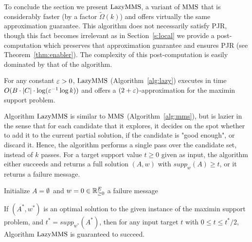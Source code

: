 To conclude the section we present $\lazy$, a variant of $\operatorname{MMS}$ that is considerably faster (by a factor $\tilde{\Omega}(k)$) and offers virtually the same approximation guarantee. 
This algorithm does not necessarily satisfy PJR, though this fact becomes irrelevant as in Section~\ref{s:local} we provide a post-computation which preserves that approximation guarantee and ensures PJR (see Theorem~\ref{thm:enabler}). The complexity of this post-computation is easily dominated by that of the algorithm.

\begin{theorem}\label{thm:2eps}
For any constant $\varepsilon>0$, $\lazy$ (Algorithm~\ref{alg:lazy}) executes in time $O(B\cdot |C|\cdot \log(\varepsilon^{-1} \log k))$ and offers a $(2+\varepsilon)$-approximation for the maximin support problem.
\end{theorem}

Algorithm $\lazy$ is similar to $\operatorname{MMS}$ (Algorithm~\ref{alg:mms}), but is lazier in the sense that for each candidate that it explores, it decides on the spot whether to add it to the current partial solution, if the candidate is "good enough", or discard it. Hence, the algorithm performs a single pass over the candidate set, instead of $k$ passes. 
For a target support value $t\geq 0$ given as input, the algorithm either succeeds and returns a full solution $(A,w)$ with $supp_w(A)\geq t$, or it returns a failure message. 

\begin{algorithm}[htb]\label{alg:lazy}
\SetAlgoLined
{}
Initialize $A=\emptyset$\ and $w=0\in\mathbb{R}_{\geq 0}^E$\;
\Return a failure message\;
\caption{$\lazy$}
\end{algorithm}

\begin{lemma}\label{lem:success}
If $(A^*, w^*)$ is an optimal solution to the given instance of the maximin support problem, and $t^*=supp_{w^*}(A^*)$, then for any input target $t$ with $0\leq t\leq t^*/2$, Algorithm $\lazy$ is guaranteed to succeed.
\end{lemma}

